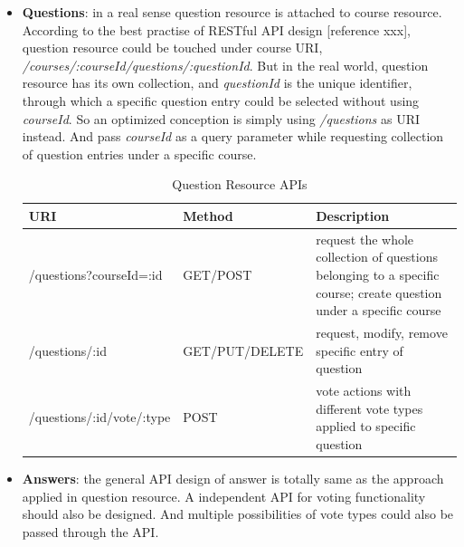 \begin{itemize}
\item
\textbf{Questions}: in a real sense question resource is attached to course resource. According to the best practise of RESTful API design [reference xxx], question resource could be touched under course URI, \textit{/courses/:courseId/questions/:questionId}. But in the real world, question resource has its own collection, and \textit{questionId} is the unique identifier, through which a specific question entry could be selected without using  
\textit{courseId}. So an optimized conception is simply using \textit{/questions} as URI instead. And pass \textit{courseId} as a query parameter while requesting collection of question entries under a specific course. 
\begin{table}[!htbp]
\centering

\begin{tabularx}{\textwidth}{@{}llX@{}}
\toprule
URI                                   & Method         & Description                                                                                                                                                 \\ \midrule
/questions?courseId=:id               & GET/POST       & request the whole collection of questions belonging to a specific course; create question under a specific course \\
/questions/:id                & GET/PUT/DELETE & request, modify, remove specific entry of question                                                                                                          \\
/questions/:id/vote/:type      & POST          & vote actions with different vote types applied to specific question  \\ \bottomrule
\end{tabularx}
\caption{Question Resource APIs}
\label{table:question-resource-apis}
\end{table}


\item
\textbf{Answers}: the general API design of answer is totally same as the approach applied in question resource. A independent API for voting functionality should also be designed. And multiple possibilities of vote types could also be passed through the API.

\begin{table}[!htbp]
\centering


\end{table}
\end{itemize}
